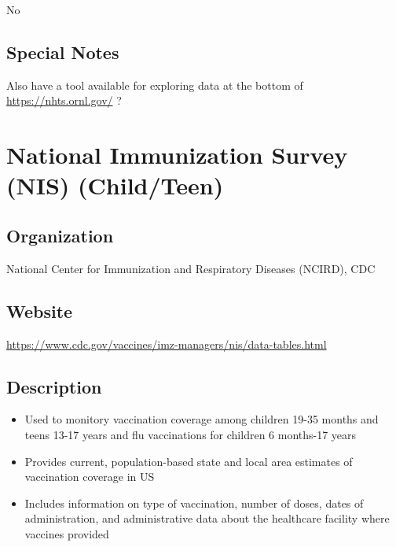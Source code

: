\documentclass[
]{book}
\providecommand{\tightlist}{%
  \setlength{\itemsep}{0pt}\setlength{\parskip}{0pt}}
\begin{document}
No

\hypertarget{special-notes-52}{%
\section{Special Notes}\label{special-notes-52}}

Also have a tool available for exploring data at the bottom of \url{https://nhts.ornl.gov/} ?

\mainmatter

\hypertarget{national-immunization-survey-nis-childteen}{%
\chapter{National Immunization Survey (NIS) (Child/Teen)}\label{national-immunization-survey-nis-childteen}}

\hypertarget{organization-53}{%
\section{Organization}\label{organization-53}}

National Center for Immunization and Respiratory Diseases (NCIRD), CDC

\hypertarget{website-53}{%
\section{Website}\label{website-53}}

\url{https://www.cdc.gov/vaccines/imz-managers/nis/data-tables.html}

\hypertarget{description-53}{%
\section{Description}\label{description-53}}

\begin{itemize}
\tightlist
\item
  Used to monitory vaccination coverage among children 19-35 months and teens 13-17 years and flu vaccinations for children 6 months-17 years
\item
  Provides current, population-based state and local area estimates of vaccination coverage in US
\item
  Includes information on type of vaccination, number of doses, dates of administration, and administrative data about the healthcare facility where vaccines provided
\end{itemize}
\end{document}
